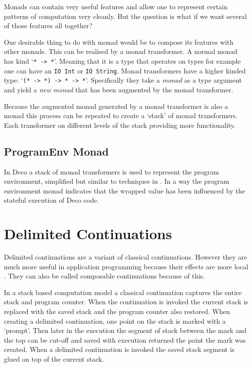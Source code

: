\documentclass[]{article}
\newcommand{\type}[1]{\texttt{#1}}
\begin{document}
Monads can contain very useful features and allow one to represent
certain patterns of computation very cleanly. But the question is
what if we want several of those features all together?

One desirable thing to do with monad would be to compose its features with
other monads. This can be realised by a monad transformer. A normal monad has
kind `\type{* -> *}'. Meaning that it is a type that operates on types for
example one can have an \type{IO Int} or \type{IO String}. Monad transformers
have a higher kinded type: `\type{(* -> *) -> * -> *}'. Specifically they take
a \emph{monad} as a type argument and yield a \emph{new monad} that has
been augmented by the monad transformer.

Because the augmented monad generated by a monad transformer is also a monad
this process can be repeated to create a `stack' of monad transformers. Each
transformer on different levels of the stack providing more functionality.

\subsection{ProgramEnv Monad}

In Deco a stack of monad transformers is used to represent the program
environment, simplified but similar to techniques in \cite{Liang:Unknown1}. In
a way the program environment monad indicates that the wrapped value has been
influenced by the stateful execution of Deco code.

\section{Delimited Continuations}
\label{discussion:delcont}

Delimited continuations are a variant of classical continuations. However they
are much more useful in application programming because their effects are more
local \cite{Oleg:2011}. They can also be called composable continuations
because of this.

In a stack based computation model a classical continuation captures the
entire stack and program counter. When the continuation is invoked the current
stack is replaced with the saved stack and the program counter also restored.
When creating a delimited continuation, one point on the stack is marked with
a `prompt'. Then later in the execution the segment of stack between the mark
and the top can be cut-off and saved with execution returned the point the
mark was created. When a delimited continuation is invoked the saved
stack segment is glued on top of the current stack.
\end{document}
